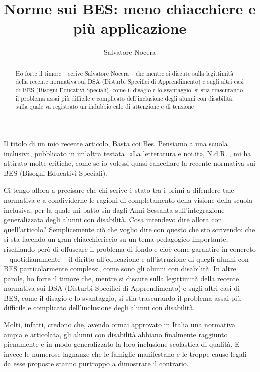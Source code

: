 \author{Salvatore Nocera}
\title{Norme sui BES: meno chiacchiere e più applicazione}
\label{cha:nocera061213}
\begin{abstract}
Ho forte il timore – scrive Salvatore Nocera – che mentre si discute sulla legittimità della recente normativa sui DSA (Disturbi Specifici di Apprendimento) e sugli altri casi di BES (Bisogni Educativi Speciali), come il disagio e lo svantaggio, si stia trascurando il problema assai più difficile e complicato dell'inclusione degli alunni con disabilità, sulla quale va registrato un indubbio calo di attenzione e di tensione
\end{abstract}
\maketitle
{}
Il titolo di un mio recente articolo, Basta coi Bes\pageref{cha:nocera021213}. Pensiamo a una scuola inclusiva, pubblicato in un'altra testata [«La letteratura e noi.it», N.d.R.], mi ha attirato molte critiche, come se io volessi quasi cancellare la recente normativa sui BES (Bisogni Educativi Speciali).

Ci tengo allora a precisare che chi scrive è stato tra i primi a difendere tale normativa e a condividerne le ragioni di completamento della visione della scuola inclusiva, per la quale mi batto sin dagli Anni Sessanta sull'integrazione generalizzata degli alunni con disabilità.
Cosa intendevo dire allora con quell'articolo? Semplicemente ciò che voglio dire con questo che sto scrivendo: che si sta facendo un gran chiacchiericcio su un tema pedagogico importante, rischiando però di offuscare il problema di fondo e cioè come garantire in concreto – quotidianamente – il diritto all'educazione e all'istruzione di quegli alunni con BES particolarmente complessi, come sono gli alunni con disabilità. In altre parole, ho forte il timore che, mentre si discute sulla legittimità della recente normativa sui DSA (Disturbi Specifici di Apprendimento) e sugli altri casi di BES, come il disagio e lo svantaggio, si stia trascurando il problema assai più difficile e complicato dell'inclusione degli alunni con disabilità.

Molti, infatti, credono che, avendo ormai approvato in Italia una normativa ampia e articolata, gli alunni con disabilità abbiano finalmente raggiunto pienamente e in modo generalizzato la loro inclusione scolastica di qualità. E invece le numerose lagnanze che le famiglie manifestano e le troppe cause legali da esse proposte stanno purtroppo a dimostrare il contrario.


